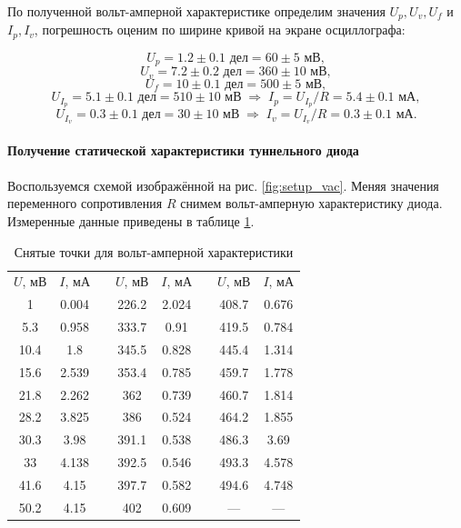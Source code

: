 \documentclass[a4paper,12pt]{article}
\begin{document}
	По полученной вольт-амперной характеристике определим значения $U_p, U_v, U_f$ и $I_p, I_v$, погрешность оценим по ширине кривой на экране осциллографа:
	
\[
U_p = 1.2 \pm 0.1 \text{ дел} = 60 \pm 5 \text{ мВ},
\]\[
U_v = 7.2 \pm 0.2 \text{ дел} = 360 \pm 10 \text{ мВ},
\]\[
U_f = 10 \pm 0.1 \text{ дел} = 500 \pm 5 \text{ мВ},
\]\[
U_{I_p} = 5.1 \pm 0.1 \text{ дел} = 510 \pm 10  \text{ мВ} \; \Rightarrow \; I_p = U_{I_p} / R = 5.4 \pm 0.1 \text{ мА},
\]\[
U_{I_v} = 0.3 \pm 0.1 \text{ дел} = 30 \pm 10  \text{ мВ} \; \Rightarrow \; I_v = U_{I_v} / R = 0.3 \pm 0.1 \text{ мА}.
\]
	
\paragraph{Получение статической характеристики туннельного диода}

\paragraph{}  
	Воспользуемся схемой изображённой на рис. \ref{fig:setup_vac}. Меняя значения переменного сопротивления $R$ снимем вольт-амперную характеристику диода. Измеренные данные приведены в таблице \ref{tab:vac}. 

\begin{table}[h]
\centering
\begin{tabular}{|c|c|c|c|c|c|c|c|}
\cline{1-2} \cline{4-5} \cline{7-8}
$U$, мВ & $I$, мА &  & $U$, мВ & $I$, мА &  & $U$, мВ & $I$, мА \\ \cline{1-2} \cline{4-5} \cline{7-8} 
1       & 0.004   &  & 226.2   & 2.024   &  & 408.7   & 0.676   \\ \cline{1-2} \cline{4-5} \cline{7-8} 
5.3     & 0.958   &  & 333.7   & 0.91    &  & 419.5   & 0.784   \\ \cline{1-2} \cline{4-5} \cline{7-8} 
10.4    & 1.8     &  & 345.5   & 0.828   &  & 445.4   & 1.314   \\ \cline{1-2} \cline{4-5} \cline{7-8} 
15.6    & 2.539   &  & 353.4   & 0.785   &  & 459.7   & 1.778   \\ \cline{1-2} \cline{4-5} \cline{7-8} 
21.8    & 2.262   &  & 362     & 0.739   &  & 460.7   & 1.814   \\ \cline{1-2} \cline{4-5} \cline{7-8} 
28.2    & 3.825   &  & 386     & 0.524   &  & 464.2   & 1.855   \\ \cline{1-2} \cline{4-5} \cline{7-8} 
30.3    & 3.98    &  & 391.1   & 0.538   &  & 486.3   & 3.69    \\ \cline{1-2} \cline{4-5} \cline{7-8} 
33      & 4.138   &  & 392.5   & 0.546   &  & 493.3   & 4.578   \\ \cline{1-2} \cline{4-5} \cline{7-8} 
41.6    & 4.15    &  & 397.7   & 0.582   &  & 494.6   & 4.748   \\ \cline{1-2} \cline{4-5} \cline{7-8} 
50.2    & 4.15    &  & 402     & 0.609   &  & ---     & ---     \\ \cline{1-2} \cline{4-5} \cline{7-8} 
\end{tabular}
\caption{Снятые точки для вольт-амперной характеристики}
\label{tab:vac}
\end{table}
\end{document}

